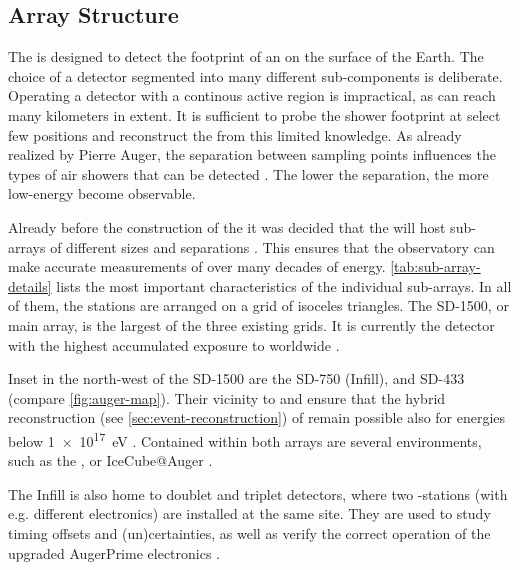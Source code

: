 \subsection{Array Structure}
\label{ssec:array-structure}

The \SD is designed to detect the footprint of an \EAS on the surface of the 
Earth. The choice of a detector segmented into many different sub-components is
deliberate. Operating a detector with a continous active region is impractical, 
as \EASs can reach many kilometers in extent. It is sufficient to probe the 
shower footprint at select few positions and reconstruct the \EAS from this 
limited knowledge. As already realized by Pierre Auger, the separation between 
sampling points influences the types of air showers that can be detected 
. The lower the separation, the more low-energy \EAS become 
observable.

Already before the construction of the \PAO it was decided that the \SD will 
host sub-arrays of different sizes and separations 
\cite{watsonDevelopmentPierreAuger}. This ensures that the observatory can 
make accurate measurements of \EAS over many decades of energy. 
\cref{tab:sub-array-details} lists the most important characteristics of the 
individual sub-arrays. In all of them, the stations are arranged on a grid of 
isoceles triangles. The SD-1500, or main array, is the largest of the three 
existing grids. It is currently the detector with the highest accumulated 
exposure to \CRs worldwide \cite{aabPierreAugerObservatory2020}.

Inset in the north-west of the SD-1500 are the SD-750 (Infill), and SD-433
(compare \cref{fig:auger-map}). Their vicinity to \CO and \HEAT ensure that the 
hybrid reconstruction (see \cref{sec:event-reconstruction}) of \EAS remain 
possible also for energies below \SI{1e17}{\eV}
\cite{mathesHEATTelescopesPierre2011}. Contained within both arrays are several
\RND environments, such as the \AERA \cite{fuchsAugerEngineeringRadio2012}, or 
IceCube@Auger \cite{schroederIceTopAuger2025}. 

The Infill is also home to doublet and triplet detectors, where two 
\SD-stations (with e.g. different electronics) are installed at the same site. 
They are used to study timing offsets and (un)certainties, as well as verify 
the correct operation of the upgraded AugerPrime electronics 
\cite{payerasCompatibilityUBUUB2023}.

